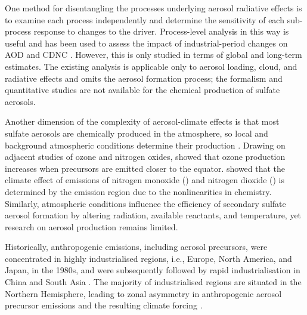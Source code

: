 One method for disentangling the processes underlying aerosol radiative effects is to examine each process independently and determine the sensitivity of each sub-process response to changes to the driver. Process-level analysis in this way is useful and has been used to assess the impact of industrial-period changes on AOD and CDNC \citep{bellouinBoundingGlobalAerosol2020,ghanChallengesConstrainingAnthropogenic2016}. However, this is only studied in terms of global and long-term estimates. The existing analysis is applicable only to aerosol loading, cloud, and radiative effects and omits the aerosol formation process; the formalism and quantitative studies are not available for the chemical production of sulfate aerosols.

Another dimension of the complexity of aerosol-climate effects is that most sulfate aerosols are chemically produced in the atmosphere, so local and background atmospheric conditions determine their production \citep{karsetStrongImpactsAerosol2018}. Drawing on adjacent studies of ozone and nitrogen oxides, \citet{zhangTroposphericOzoneChange2016} showed that ozone production increases when precursors are emitted closer to the equator. \citet{fuglestvedtClimaticForcingNitrogen1999} showed that the climate effect of emissions of nitrogen monoxide () and nitrogen dioxide () is determined by the emission region due to the nonlinearities in  chemistry. Similarly, atmospheric conditions influence the efficiency of secondary sulfate aerosol formation by altering radiation, available reactants, and temperature, yet research on aerosol production remains limited.

Historically, anthropogenic emissions, including aerosol precursors, were concentrated in highly industrialised regions, i.e., Europe, North America, and Japan, in the 1980s, and were subsequently followed by rapid industrialisation in China and South Asia \citep{szopaShortlivedClimateForcers2021}. The majority of industrialised regions are situated in the Northern Hemisphere, leading to zonal asymmetry in anthropogenic aerosol precursor emissions and the resulting climate forcing \citep{diaoAnthropogenicAerosolEffects2021}.  

